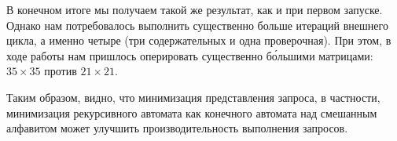 \begin{example}
В конечном итоге мы получаем такой же результат, как и при первом запуске.
Однако нам потребовалось выполнить существенно больше итераций внешнего цикла, а именно четыре (три содержательных и одна проверочная).
При этом, в ходе работы нам пришлось оперировать существенно б\'{о}льшими матрицами: $35 \times 35$ против $21 \times 21$.

Таким образом, видно, что минимизация представления запроса, в частности, минимизация рекурсивного автомата как конечного автомата над смешанным алфавитом может улучшить производительность выполнения запросов.
\end{example}


